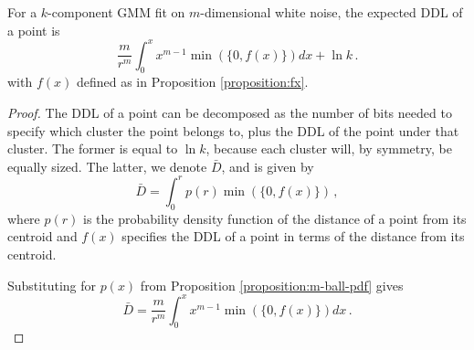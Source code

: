 \begin{lemma} \label{lemma:form-of-EDDL}
For a $k$-component GMM fit on $m$-dimensional white noise, the expected DDL of a point is 
\[
\frac{m}{r^m}\int_0^x x^{m-1} \min(\{0,f(x)\}) dx + \ln{k} \,.
\]
with $f(x)$ defined as in Proposition \ref{proposition:fx}.
\end{lemma}
\begin{proof}
The DDL of a point can be decomposed as the number of bits needed to specify which cluster the point belongs to, plus the DDL of the point under that cluster. The former is equal to $\ln{k}$, because each cluster will, by symmetry, be equally sized. The latter, we denote $\bar{D}$, and is given by
\[
\bar{D} = \int_0^r p(r) \min(\{0,f(x)\}) \,,
\]
where $p(r)$ is the probability density function of the distance of a point from its centroid and $f(x)$ specifies the DDL of a point in terms of the distance from its centroid. 

Substituting for $p(x)$ from Proposition \ref{proposition:m-ball-pdf} gives 
\[
\bar{D} = \frac{m}{r^m}\int_0^x x^{m-1} \min(\{0,f(x)\}) dx \,.
\]
\end{proof}

